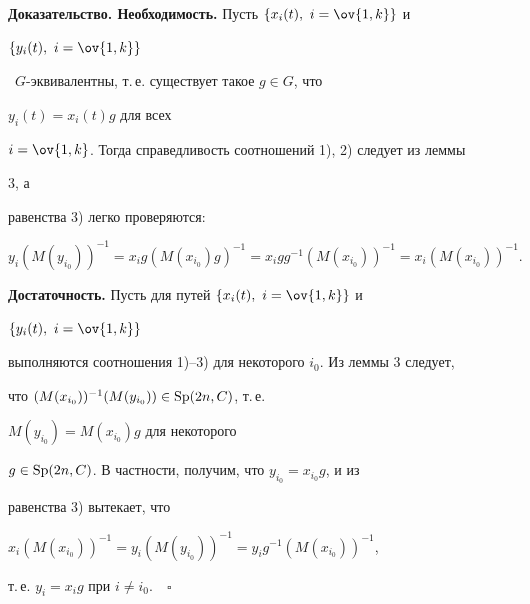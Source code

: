 {\bf Доказательство. Необходимость.} Пусть $\{x_i(t),\ i=\ov{1,k}\}$ и 


$\{y_i(t),\ i=\ov{1,k}\}$


\ $G$-эквивалент\-ны, т.\,е. существует такое $g\in G$, что 


$y_i(t)=x_i(t)g$ для всех


$i=\ov{1,k}$. Тогда справедливость соотношений 1), 2) следует из леммы 


3, а 


равенства 3) легко проверяются:


$$


y_i(M(y_{i_0}))^{-1}=x_i g(M(x_{i_0})g)^{-1}=


x_i g g^{-1}(M(x_{i_0}))^{-1}=x_i(M(x_{i_0}))^{-1}.


$$





{\bf Достаточность.} Пусть для путей $\{x_i(t),\ i=\ov{1,k}\}$ и 


$\{y_i(t),\ i=\ov{1,k}\}$


выполняются соотношения 1)--3) для некоторого $i_0$. Из леммы 3 следует, 


что $(M(x_{i_0}))^{-1}(M(y_{i_0}))\in\operatorname{Sp}(2n,C)$, т.\,е. 


$M(y_{i_0})=M(x_{i_0})g$ для некоторого 


$g\in\operatorname{Sp}(2n,C)$. В частности, получим, что $y_{i_0}=x_{i_0}g$, и из 


равенства 3) вытекает, что


$x_i(M(x_{i_0}))^{-1}=y_i(M(y_{i_0}))^{-1}=y_i g^{-1}(M(x_{i_0}))^{-1}$,


т.\,е. $y_i=x_i g$ при $i\ne i_0$.$\quad\square$





